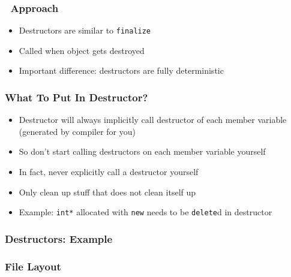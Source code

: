 \documentclass{../ucll-slides}
\begin{document}
\begin{frame}
  \frametitle{\cpp\ Approach}
  \begin{itemize}
    \item Destructors are similar to {\tt finalize}
    \item Called when object gets destroyed
    \item Important difference: destructors are fully deterministic
  \end{itemize}
  \vskip5mm
  \begin{overprint}



  \end{overprint}
\end{frame}

\begin{frame}
  \frametitle{What To Put In Destructor?}
  \begin{itemize}
    \item Destructor will always implicitly call destructor of each member variable
          (generated by compiler for you)
    \item So don't start calling destructors on each member variable yourself
    \item In fact, never explicitly call a destructor yourself
    \item Only clean up stuff that does not clean itself up
    \item Example: {\tt int*} allocated with {\tt new} needs to be {\tt delete}d in destructor
  \end{itemize}
\end{frame}

\begin{frame}
  \frametitle{Destructors: Example}
\end{frame}

\begin{frame}
  \frametitle{File Layout}
  \begin{columns}
    \column{6cm}
    \column{6cm}
  \end{columns}
\end{frame}

\end{document}
